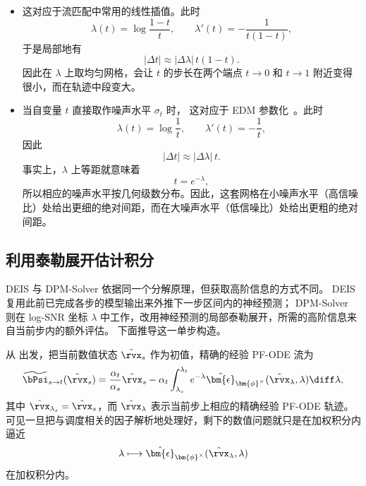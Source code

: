 \begin{itemize}
\item {}
这对应于流匹配中常用的线性插值。此时
\[
\lambda(t)
=
\log\frac{1-t}{t},
\qquad
\lambda'(t)
=
-\frac{1}{t(1-t)},
\]
于是局部地有
\[
|\Delta t|
\approx
|\Delta\lambda|\,t(1-t).
\]
因此在 $\lambda$ 上取均匀网格，会让 $t$ 的步长在两个端点
$t\to0$ 和 $t\to1$ 附近变得很小，而在轨迹中段变大。

\item {}
当自变量 $t$ 直接取作噪声水平 $\sigma_t$ 时，
这对应于 EDM 参数化~\citep{karras2022elucidating}。此时
\[
\lambda(t)
=
\log\frac{1}{t},
\qquad
\lambda'(t)
=
-\frac{1}{t},
\]
因此
\[
|\Delta t|
\approx
|\Delta\lambda|\,t.
\]
事实上，$\lambda$ 上等距就意味着
\[
t=e^{-\lambda},
\]
所以相应的噪声水平按几何级数分布。因此，这套网格在小噪声水平（高信噪比）处给出更细的绝对间距，而在大噪声水平（低信噪比）处给出更粗的绝对间距。
\end{itemize}


\subsection{利用泰勒展开估计积分}\label{subsec:dpm-method-2}
DEIS 与 DPM-Solver 依据同一个分解原理，但获取高阶信息的方式不同。
DEIS 复用此前已完成各步的模型输出来外推下一步区间内的神经预测；
DPM-Solver 则在 log-SNR 坐标 $\lambda$ 中工作，改用神经预测的局部泰勒展开，所需的高阶信息来自当前步内的额外评估。
下面推导这一单步构造。

从  出发，把当前数值状态 $\tilde\rvx_s$
作为初值，精确的经验 PF-ODE 流为
\begin{equation}
\label{eqn:analytic_solution_each_step}
\widetilde\bPsi_{s\to t}(\tilde\rvx_s)
=
\frac{\alpha_t}{\alpha_s}\tilde\rvx_s
-
\alpha_t
\int_{\lambda_s}^{\lambda_t}
e^{-\lambda}
\hat{\bm{\epsilon}}_{\bm{\phi}^\times}
(\hat\rvx_\lambda,\lambda)
\diff\lambda,
\end{equation}
其中 $\hat\rvx_{\lambda_s}=\tilde\rvx_s$，而 $\hat\rvx_\lambda$
表示当前步上相应的精确经验 PF-ODE 轨迹。可见一旦把与调度相关的因子解析地处理好，剩下的数值问题就只是在加权积分内逼近
\[
\lambda
\longmapsto
\hat{\bm{\epsilon}}_{\bm{\phi}^\times}
(\hat\rvx_\lambda,\lambda)
\]
在加权积分内。

